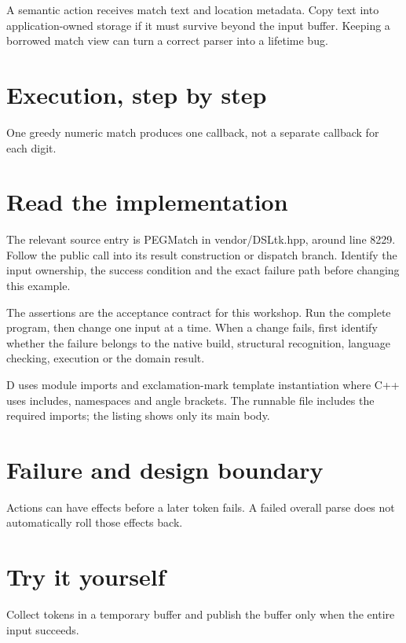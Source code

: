 \clearpage
{}
A semantic action receives match text and location metadata. Copy text into application-owned storage if it must survive beyond the input buffer. Keeping a borrowed match view can turn a correct parser into a lifetime bug.


\section*{Execution, step by step}
One greedy numeric match produces one callback, not a separate callback for each digit.

\section*{Read the implementation}
The relevant source entry is PEGMatch in vendor/DSLtk.hpp, around line 8229. Follow the public call into its result construction or dispatch branch. Identify the input ownership, the success condition and the exact failure path before changing this example.

The assertions are the acceptance contract for this workshop. Run the complete program, then change one input at a time. When a change fails, first identify whether the failure belongs to the native build, structural recognition, language checking, execution or the domain result.

\clearpage
{}
D uses module imports and exclamation-mark template instantiation where C++ uses includes, namespaces and angle brackets. The runnable file includes the required imports; the listing shows only its main body.


\section*{Failure and design boundary}
Actions can have effects before a later token fails. A failed overall parse does not automatically roll those effects back.

\section*{Try it yourself}
Collect tokens in a temporary buffer and publish the buffer only when the entire input succeeds.

